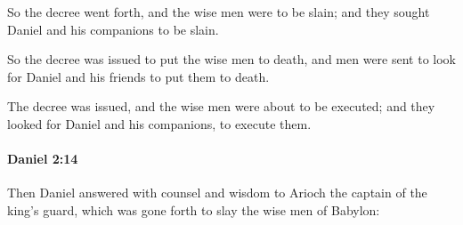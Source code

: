 			\begin{versebox}
					\item[BHS] 
					\item[LXX] 
					\item[ASV] So the decree went forth, and the wise men were to be slain; and they sought Daniel and his companions to be slain.
					\item[NIV] So the decree was issued to put the wise men to death, and men were sent to look for Daniel and his friends to put them to death.
					\item[NRSV] The decree was issued, and the wise men were about to be executed; and they looked for Daniel and his companions, to execute them.
			\end{versebox}

		\paragraph{Daniel 2:14} %
			\label{DANIEL-2-14}

			Then Daniel answered with counsel and wisdom to Arioch the captain of the king’s guard, which was gone forth to slay the wise men of Babylon:

